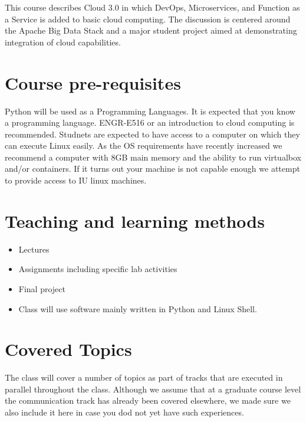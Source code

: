 This course describes Cloud 3.0 in which DevOps, Microservices, and
Function as a Service is added to basic cloud computing. The
discussion is centered around the Apache Big Data Stack and a major
student project aimed at demonstrating integration of cloud
capabilities.

\section{Course pre-requisites}

Python will be used as a Programming Languages. It is expected that
you know a programming language. ENGR-E516 or an introduction to cloud
computing is recommended. Studnets are expected to have access to a
computer on which they can execute Linux easily. As the OS
requirements have recently increased we recommend a computer with 8GB
main memory and the ability to run virtualbox and/or containers. If it
turns out your machine is not capable enough we attempt to provide
access to IU linux machines.

\section{Teaching and learning methods}

\begin{itemize}
\item	Lectures
\item	Assignments including specific lab activities
\item	Final project
\item Class will use software mainly written in Python
  and Linux Shell.
\end{itemize}



\section{Covered Topics}

The class will cover a number of topics as part of tracks that are
executed in parallel throughout the class. Although we assume that at
a graduate course level the communication track has already been
covered elsewhere, we made sure we also include it here in case you dod
not yet have such experiences.

